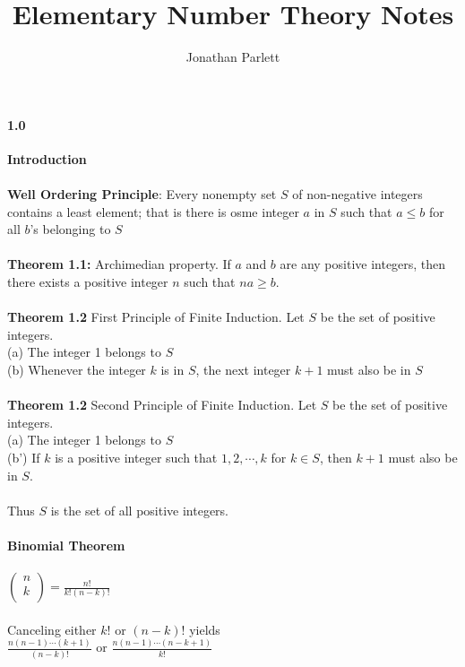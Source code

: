 \documentclass[14pt]{extreport}
\title{Elementary Number Theory Notes}
\author{Jonathan Parlett}
\begin{document}
\paragraph{1.0} \textbf{Introduction}\\\\

\textbf{Well Ordering Principle}: Every nonempty set $S$ of non-negative integers contains a least element; that is there is osme integer $a$ in $S$ such that $a \le b$ for all $b$'s belonging to $S$\\\\

\textbf{Theorem 1.1:} Archimedian property. If $a$ and $b$ are any positive integers, then there exists a positive integer $n$ such that $na \ge b$.\\\\

\textbf{Theorem 1.2} First Principle of Finite Induction. Let $S$ be the set of positive integers.\\
    (a) The integer 1 belongs to $S$\\
    (b) Whenever the integer $k$ is in $S$, the next integer $k+1$ must also be in $S$\\\\

\textbf{Theorem 1.2} Second Principle of Finite Induction. Let $S$ be the set of positive integers.\\
    (a) The integer 1 belongs to $S$\\
    (b') If $k$ is a positive integer such that $1, 2, \cdots ,k$ for $k \in S$, then $k+1$ must also be in $S$.\\\\


    Thus $S$ is the set of all positive integers.\\\\

  \textbf{Binomial Theorem}\\\\
  $
  \begin{pmatrix}
      n\\
      k\\
  \end{pmatrix}
  = \frac{n!}{k!(n-k)!}$\\\\

  Canceling either $k!$ or $(n-k)!$ yields\\
  
  $\frac{n(n-1) \cdots (k+1)}{(n-k)!}$ or $\frac{n(n-1) \cdots (n-k+1)}{k!}$\\
\end{document}
